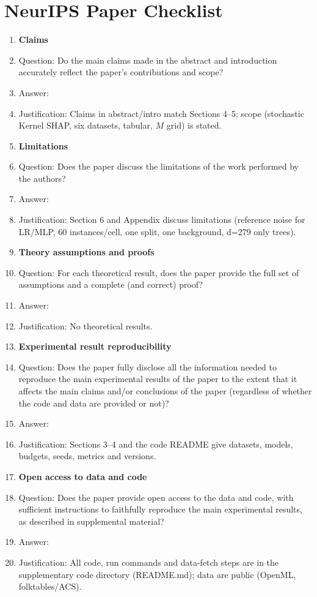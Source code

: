 \section*{NeurIPS Paper Checklist}
\begin{enumerate}
\item {\bf Claims}
 \item[] Question: Do the main claims made in the abstract and introduction accurately reflect the paper's contributions and scope?
 \item[] Answer: \answerYes{}
 \item[] Justification: Claims in abstract/intro match Sections 4--5; scope (stochastic Kernel SHAP, six datasets, tabular, $M$ grid) is stated.

\item {\bf Limitations}
 \item[] Question: Does the paper discuss the limitations of the work performed by the authors?
 \item[] Answer: \answerYes{}
 \item[] Justification: Section 6 and Appendix discuss limitations (reference noise for LR/MLP, 60 instances/cell, one split, one background, d=279 only trees).

\item {\bf Theory assumptions and proofs}
 \item[] Question: For each theoretical result, does the paper provide the full set of assumptions and a complete (and correct) proof?
 \item[] Answer: \answerNA{}
 \item[] Justification: No theoretical results.

\item {\bf Experimental result reproducibility}
 \item[] Question: Does the paper fully disclose all the information needed to reproduce the main experimental results of the paper to the extent that it affects the main claims and/or conclusions of the paper (regardless of whether the code and data are provided or not)?
 \item[] Answer: \answerYes{}
 \item[] Justification: Sections 3--4 and the code README give datasets, models, budgets, seeds, metrics and versions.

\item {\bf Open access to data and code}
 \item[] Question: Does the paper provide open access to the data and code, with sufficient instructions to faithfully reproduce the main experimental results, as described in supplemental material?
 \item[] Answer: \answerYes{}
 \item[] Justification: All code, run commands and data-fetch steps are in the supplementary code directory (README.md); data are public (OpenML, folktables/ACS).


\end{enumerate}
